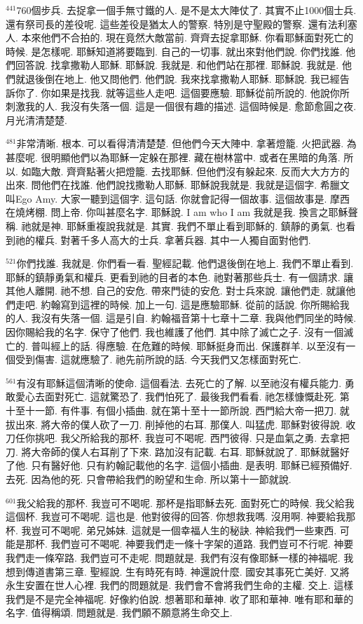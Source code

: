 \documentclass{book}
\begin{document}
$^{441}$760個步兵.
去捉拿一個手無寸鐵的人.
是不是太大陣仗了.
其實不止1000個士兵.
還有祭司長的差役呢.
這些差役是猶太人的警察.
特別是守聖殿的警察.
還有法利塞人.
本來他們不合拍的.
現在竟然大敵當前.
齊齊去捉拿耶穌.
你看耶穌面對死亡的時候.
是怎樣呢.
耶穌知道將要臨到.
自己的一切事.
就出來對他們說.
你們找誰.
他們回答說.
找拿撒勒人耶穌.
耶穌說.
我就是.
和他們站在那裡.
耶穌說.
我就是.
他們就退後倒在地上.
他又問他們.
他們說.
我來找拿撒勒人耶穌.
耶穌說.
我已經告訴你了.
你如果是找我.
就等這些人走吧.
這個要應驗.
耶穌從前所說的.
他說你所刺激我的人.
我沒有失落一個.
這是一個很有趣的描述.
這個時候是.
愈節愈圓之夜.
月光清清楚楚.

$^{481}$非常清晰.
根本.
可以看得清清楚楚.
但他們今天大陣中.
拿著燈籠.
火把武器.
為甚麼呢.
很明顯他們以為耶穌一定躲在那裡.
藏在樹林當中.
或者在黑暗的角落.
所以.
如臨大敵.
齊齊點著火把燈籠.
去找耶穌.
但他們沒有躲起來.
反而大大方方的出來.
問他們在找誰.
他們說找撒勒人耶穌.
耶穌說我就是.
我就是這個字.
希臘文叫Ego Amy.
大家一聽到這個字.
這句話.
你就會記得一個故事.
這個故事是.
摩西在燒烤棚.
問上帝.
你叫甚麼名字.
耶穌說.
I am who I am 我就是我.
換言之耶穌聲稱.
祂就是神.
耶穌重複說我就是.
其實.
我們不單止看到耶穌的.
鎮靜的勇氣.
也看到祂的權兵.
對著千多人高大的士兵.
拿著兵器.
其中一人獨自面對他們.

$^{521}$你們找誰.
我就是.
你們看一看.
聖經記載.
他們退後倒在地上.
我們不單止看到.
耶穌的鎮靜勇氣和權兵.
更看到祂的目者的本色.
祂對著那些兵士.
有一個請求.
讓其他人離開.
祂不想.
自己的安危.
帶來門徒的安危.
對士兵來說.
讓他們走.
就讓他們走吧.
約翰寫到這裡的時候.
加上一句.
這是應驗耶穌.
從前的話說.
你所賜給我的人.
我沒有失落一個.
這是引自.
約翰福音第十七章十二章.
我與他們同坐的時候.
因你賜給我的名字.
保守了他們.
我也維護了他們.
其中除了滅亡之子.
沒有一個滅亡的.
普叫經上的話.
得應驗.
在危難的時候.
耶穌挺身而出.
保護群羊.
以至沒有一個受到傷害.
這就應驗了.
祂先前所說的話.
今天我們又怎樣面對死亡.

$^{561}$有沒有耶穌這個清晰的使命.
這個看法.
去死亡的了解.
以至祂沒有權兵能力.
勇敢愛心去面對死亡.
這就驚恐了.
我們怕死了.
最後我們看看.
祂怎樣慷慨赴死.
第十至十一節.
有件事.
有個小插曲.
就在第十至十一節所說.
西門給大帝一把刀.
就拔出來.
將大帝的僕人砍了一刀.
削掉他的右耳.
那僕人.
叫猛虎.
耶穌對彼得說.
收刀任你挑吧.
我父所給我的那杯.
我豈可不喝呢.
西門彼得.
只是血氣之勇.
去拿把刀.
將大帝師的僕人右耳削了下來.
路加沒有記載.
右耳.
耶穌就說了.
耶穌就醫好了他.
只有醫好他.
只有約翰記載他的名字.
這個小插曲.
是表明.
耶穌已經預備好.
去死.
因為他的死.
只會帶給我們的盼望和生命.
所以第十一節就說.

$^{601}$我父給我的那杯.
我豈可不喝呢.
那杯是指耶穌去死.
面對死亡的時候.
我父給我這個杯.
我豈可不喝呢.
這也是.
他對彼得的回答.
你想救我嗎.
沒用啊.
神要給我那杯.
我豈可不喝呢.
弟兄姊妹.
這就是一個幸福人生的秘訣.
神給我們一些東西.
可能是那杯.
我們豈可不喝呢.
神要我們走一條十字架的道路.
我們豈可不行呢.
神要我們走一條窄路.
我們豈可不走呢.
問題就是.
我們有沒有像耶穌一樣的神福呢.
我想到傳道書第三章.
聖經說.
生有時死有時.
神還說什麼.
國安其事死亡美好.
又將永生安置在世人心裡.
我們的問題就是.
我們會不會將我們生命的主權.
交上.
這樣我們是不是完全神福呢.
好像約伯說.
想著耶和華神.
收了耶和華神.
唯有耶和華的名字.
值得稱頌.
問題就是.
我們願不願意將生命交上.
\end{document}
